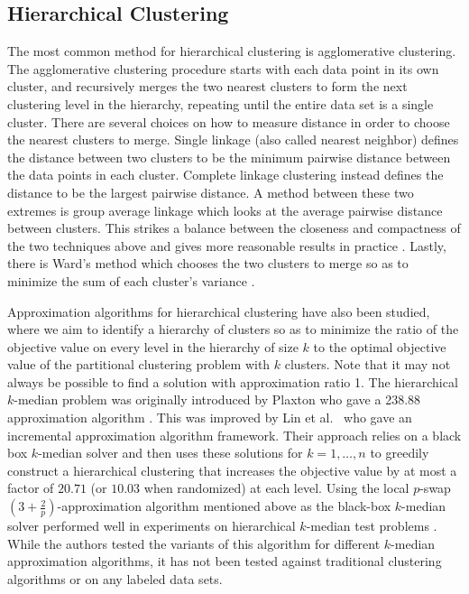 \documentclass[conference, 10pt, final]{IEEEtran}
\begin{document}
\subsection{Hierarchical Clustering}
The most common method for hierarchical clustering is agglomerative clustering. The agglomerative clustering procedure starts with each data point in its own cluster, and recursively merges the two nearest clusters to form the next clustering level in the hierarchy, repeating until the entire data set is a single cluster.  There are several choices on how to measure distance in order to choose the nearest clusters to merge. Single linkage (also called nearest neighbor) defines the distance between two clusters to be the minimum pairwise distance between the data points in each cluster.  Complete linkage clustering instead defines the distance to be the largest pairwise distance. A method between these two extremes is group average linkage which looks at the average pairwise distance between clusters. This strikes a balance between the closeness and compactness of the two techniques above and gives more reasonable results in practice \cite{ESL}. Lastly, there is Ward's method which chooses the two clusters to merge so as to minimize the sum of each cluster's variance \cite{Ward}.

Approximation algorithms for hierarchical clustering have also been studied, where we aim to identify a hierarchy of clusters so as to minimize the ratio of the objective value on every level in the hierarchy of size $k$ to the optimal objective value of the partitional clustering problem with $k$ clusters. Note that it may not always be possible to find a solution with approximation ratio 1. The hierarchical $k$-median problem was originally introduced by Plaxton who gave a 238.88 approximation algorithm \cite{Plaxton}. This was improved by Lin et al.~\cite{Lin} who gave an incremental approximation algorithm framework. Their approach relies on a black box $k$-median solver and then uses these solutions for $k=1, \ldots, n$ to greedily construct a hierarchical clustering that increases the objective value by at most a factor of $20.71$ (or $10.03$ when randomized) at each level. Using the local $p$-swap $(3+\frac{2}{p})$-approximation algorithm mentioned above as the black-box $k$-median solver performed well in experiments on hierarchical $k$-median test problems \cite{Nagarajan}. While the authors tested the variants of this algorithm for different $k$-median approximation algorithms, it has not been tested against traditional clustering algorithms or on any labeled data sets. 
\end{document}
